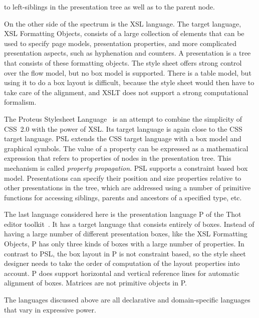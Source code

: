         to left-siblings in the presentation tree as well as to the parent node. 
\par {} On the other side of the spectrum is
        the XSL language. The target language, XSL Formatting Objects, consists of a
        large collection of elements that can be used to specify page models,
        presentation properties, and more complicated presentation aspects, such as
        hyphenation and counters. A presentation is a tree that consists of these
        formatting objects. The style sheet offers strong control over the flow model,
        but no box model is supported. There is a table model, but using it to do a box
        layout is difficult, because the style sheet would then have to take care of
        the alignment, and XSLT does not support a strong computational formalism.
\par {} The Proteus Stylesheet
        Language~\cite{psl} is an attempt to combine the simplicity of
        CSS~2.0 with the power of XSL. Its target language is again close to the
        CSS target language. PSL extends the CSS target language with a box model and
        graphical symbols. The value of a property can be expressed as a mathematical
        expression that refers to properties of nodes in the presentation tree. This
        mechanism is called {\em property propagation}. PSL supports a constraint
        based box model. Presentations can specify their position and size properties
        relative to other presentations in the tree, which are addressed using a number
        of primitive functions for accessing siblings, parents and ancestors of a
        specified type, etc.
\par {} The last language considered here is the
        presentation language P of the Thot editor toolkit~\cite{thot}.
        It has a target language that consists entirely of boxes. Instead of having a
        large number of different presentation boxes, like the XSL Formatting Objects,
        P has only three kinds of boxes with a large number of properties. In contrast
        to PSL, the box layout in P is not constraint based, so the style sheet
        designer needs to take the order of computation of the layout properties into
        account. P does support horizontal and vertical reference lines for automatic
        alignment of boxes. Matrices are not primitive objects in P.
\par {} The languages discussed above are
        all declarative and domain-specific languages that vary in expressive power.
